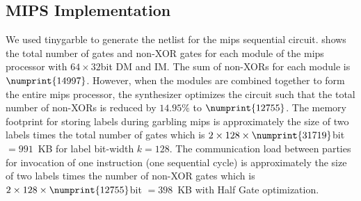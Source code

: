 \subsection{MIPS Implementation}
We used \gls{tinygarble} to generate the \gls{netlist} for the \gls{mips} sequential circuit.
 shows the total number of gates and non-XOR gates for each module of the \gls{mips} processor with $64\times32$bit DM and IM.
The sum of non-XORs for each module is $\numprint{14997}$.
However, when the modules are combined together to form the entire \gls{mips} processor, the synthesizer optimizes the circuit such that the total number of non-XORs is reduced by $14.95\%$ to $\numprint{12755}$.
The memory footprint for storing labels during garbling \gls{mips} is approximately the size of two labels times the total number of gates which is $2 \times 128 \times \numprint{31719}$bit $=991$~KB for label bit-width $k=128$.
The communication load between parties for invocation of one instruction (one sequential cycle) is approximately the size of two labels times the number of non-XOR gates which is $2\times 128 \times \numprint{12755}$bit $=398$~KB with Half Gate optimization.

